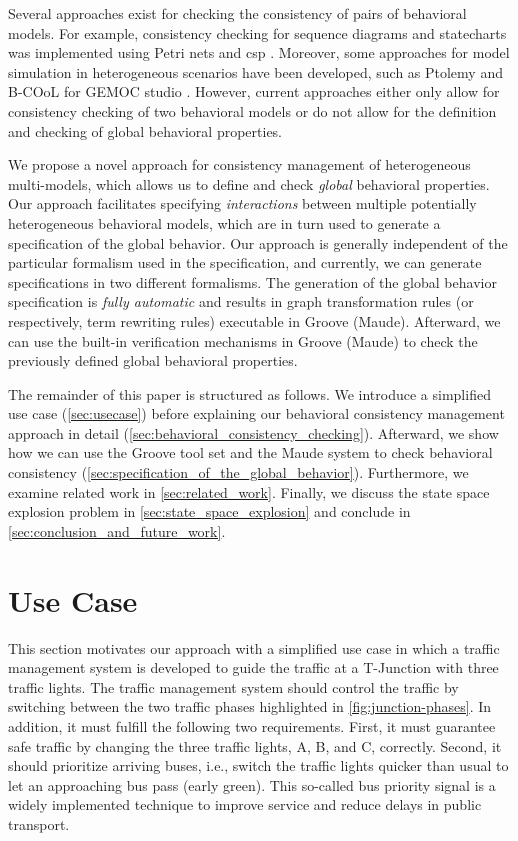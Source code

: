\documentclass{jot}
\begin{document}
Several approaches exist for checking the consistency of pairs of behavioral models.
For example, consistency checking for sequence diagrams and statecharts was implemented using Petri nets \cite{yaoConsistencyCheckingUML2006} and \gls*{csp} \cite{kusterExplicitBehavioralConsistency2003}.
Moreover, some approaches for model simulation in heterogeneous scenarios have been developed, such as Ptolemy \cite{ekerTamingHeterogeneityPtolemy2003} and B-COoL for GEMOC studio \cite{varalarsenBehavioralCoordinationOperator2015}.
However, current approaches either only allow for consistency checking of two behavioral models or do not allow for the definition and checking of global behavioral properties.

We propose a novel approach for consistency management of heterogeneous multi-models, which allows us to define and check \emph{global} behavioral properties.
Our approach facilitates specifying \emph{interactions} between multiple potentially heterogeneous behavioral models, which are in turn used to generate a specification of the global behavior.
Our approach is generally independent of the particular formalism used in the specification, and currently, we can generate specifications in two different formalisms.
The generation of the global behavior specification is \emph{fully automatic} and results in graph transformation rules (or respectively, term rewriting rules) executable in Groove (Maude).
Afterward, we can use the built-in verification mechanisms in Groove (Maude) to check the previously defined global behavioral properties.

The remainder of this paper is structured as follows.
We introduce a simplified use case (\autoref{sec:usecase}) before explaining our behavioral consistency management approach in detail (\autoref{sec:behavioral_consistency_checking}).
Afterward, we show how we can use the Groove tool set and the Maude system to check behavioral consistency (\autoref{sec:specification_of_the_global_behavior}).
Furthermore, we examine related work in \autoref{sec:related_work}.
Finally, we discuss the state space explosion problem in \autoref{sec:state_space_explosion} and conclude in \autoref{sec:conclusion_and_future_work}.


\section{Use Case} \label{sec:usecase}
This section motivates our approach with a simplified use case in which a traffic management system is developed to guide the traffic at a T-Junction with three traffic lights.
The traffic management system should control the traffic by switching between the two traffic phases highlighted in \cref{fig:junction-phases}.
In addition, it must fulfill the following two requirements.
First, it must guarantee safe traffic by changing the three traffic lights, A, B, and C, correctly.
Second, it should prioritize arriving buses, i.e., switch the traffic lights quicker than usual to let an approaching bus pass (early green).
This so-called bus priority signal is a widely implemented technique to improve service and reduce delays in public transport.
\end{document}

